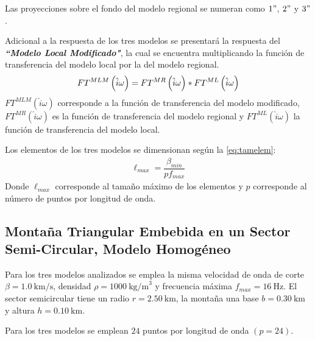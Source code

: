 \documentclass[spanish,letterpaper,12pt,twoside,openany]{article}
\begin{document}
Las proyecciones sobre el fondo del modelo regional se numeran como $1"$, $2"$ y $3"$.

Adicional a la respuesta de los tres modelos se presentará la respuesta del \textbf{\textit{``Modelo Local Modificado"}}, la cual se encuentra multiplicando la función de transferencia del modelo local por la del modelo regional.
%
	\begin{align}\label{eq:eqftmod}
		FT^{MLM} \left(\hat{i} \omega \right)= FT^{MR} \left(\hat{i} \omega \right) * FT^{ML} \left(\hat{i} \omega \right) 
		\vspace{-1 cm}
	\end{align}
%
$FT^{MLM} \left(\hat{i} \omega \right)$ corresponde a la función de transferencia del modelo modificado, $FT^{MR} \left(\hat{i} \omega \right)$ es la función de transferencia del modelo regional y $FT^{ML} \left(\hat{i} \omega \right)$ la función de transferencia del modelo local.

Los elementos de los tres modelos se dimensionan según la \cref{eq:tamelem}:
%
	\begin{align}\label{eq:tamelem}
		\ell_{max} = \dfrac{\beta_{min}}{p  f_{max}}
 	\end{align}
%
Donde $\ell_{max}$ corresponde al tamaño máximo de los elementos y $p$ corresponde al número de puntos por longitud de onda.
%
\subsection{Montaña Triangular Embebida en un Sector Semi-Circular, Modelo Homogéneo}
%
Para los tres modelos analizados se emplea la misma velocidad de onda de corte {$\beta = 1.0\ \text{km/s}$}, densidad $\rho = 1000\ \text{kg/m}^3$ y frecuencia máxima $f_{max} =  16\ \text{Hz}$. El sector semicircular tiene un radio $r=2.50\ \text{km}$, la montaña una base $b=0.30\ \text{km}$ y altura $h=0.10\ \text{km}$.

Para los tres modelos se emplean $24$ puntos por longitud de onda $\left( p = 24 \right)$.
\end{document}
